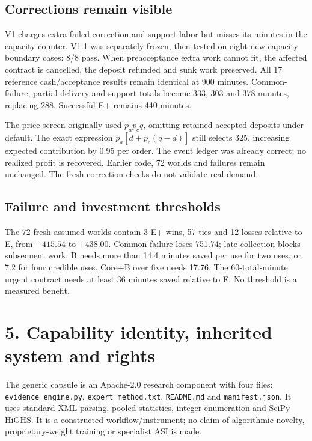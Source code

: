 \documentclass[10pt]{article}
\begin{document}
\subsection*{Corrections remain visible}

V1 charges extra failed-correction and support labor but misses its minutes in the capacity counter. V1.1 was separately frozen, then tested on eight new capacity boundary cases: 8/8 pass. When preacceptance extra work cannot fit, the affected contract is cancelled, the deposit refunded and sunk work preserved. All 17 reference cash/acceptance results remain identical at 900 minutes. Common-failure, partial-delivery and support totals become 333, 303 and 378 minutes, replacing 288. Successful E+ remains 440 minutes.

The price screen originally used $p_a p_c q$, omitting retained accepted deposits under default. The exact expression $p_a[d+p_c(q-d)]$ still selects 325, increasing expected contribution by 0.95 per order. The event ledger was already correct; no realized profit is recovered. Earlier code, 72 worlds and failures remain unchanged. The fresh correction checks do not validate real demand.

\subsection*{Failure and investment thresholds}

The 72 fresh assumed worlds contain 3 E+ wins, 57 ties and 12 losses relative to E, from $-415.54$ to $+438.00$. Common failure loses 751.74; late collection blocks subsequent work. B needs more than 14.4 minutes saved per use for two uses, or 7.2 for four credible uses. Core+B over five needs 17.76. The 60-total-minute urgent contract needs at least 36 minutes saved relative to E. No threshold is a measured benefit.

\clearpage
\section*{5. Capability identity, inherited system and rights}

The generic capsule is an Apache-2.0 research component with four files: \texttt{evidence\_engine.py}, \texttt{expert\_method.txt}, \texttt{README.md} and \texttt{manifest.json}. It uses standard XML parsing, pooled statistics, integer enumeration and SciPy HiGHS. It is a constructed workflow/instrument; no claim of algorithmic novelty, proprietary-weight training or specialist ASI is made.
\end{document}
